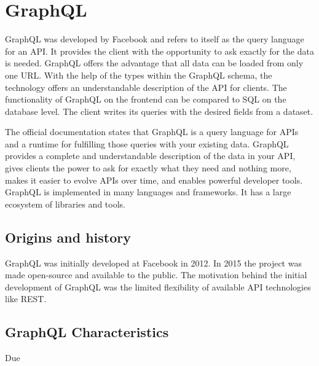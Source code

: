 \section{GraphQL}

GraphQL was developed by Facebook and refers to itself as the query language for an API. It provides the client with the opportunity to ask exactly for the data is needed. GraphQL offers the advantage that all data can be loaded from only one URL. With the help of the types within the GraphQL schema, the technology offers an understandable description of the
API for clients. \cite{misc:-:graphql-org} The functionality of GraphQL on the frontend can be compared to SQL on the database level. The client writes its queries with the desired fields from a dataset.

The official documentation states that GraphQL is a query language for APIs and a runtime for fulfilling those queries with your existing data. GraphQL provides a complete and understandable description of the data in your API, gives clients the power to ask for exactly what they need and nothing more, makes it easier to evolve APIs over time, and enables powerful developer tools. GraphQL is implemented in many languages and frameworks. It has a large ecosystem of libraries and tools.

\subsection{Origins and history}

GraphQL was initially developed at Facebook in 2012. In 2015 the project was made open-source and available to the public. The motivation behind the initial development of GraphQL was the limited flexibility of available API technologies like REST.

\subsection{GraphQL Characteristics}

Due 



